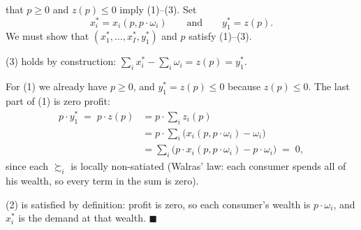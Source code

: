 \documentclass[11pt]{article}
\begin{document}
 that $p\ge 0$ and $z(p)\le 0$ imply (1)--(3). Set
\[ x_i^*=x_i(p,p\cdot\omega_i) \qquad\text{and}\qquad y_1^*=z(p). \]
We must show that $(x_1^*,\dots,x_I^*,y_1^*)$ and $p$ satisfy (1)--(3).

\begin{flatlist}
  \item (3) holds by construction: $\sum_i x_i^*-\sum_i\omega_i=z(p)=y_1^*$.
  \item For (1) we already have $p\ge 0$, and $y_1^*=z(p)\le 0$ because $z(p)\le 0$. The
        last part of (1) is zero profit:
        \begin{align*}
          p\cdot y_1^* \;=\; p\cdot z(p) &= p\cdot\sum_i z_i(p) \\
            &= p\cdot\sum_i\bigl(x_i(p,p\cdot\omega_i)-\omega_i\bigr) \\
            &= \sum_i\bigl(p\cdot x_i(p,p\cdot\omega_i)-p\cdot\omega_i\bigr) \;=\; 0,
        \end{align*}
        since each $\succsim_i$ is locally non-satiated (Walras' law: each consumer spends
        all of his wealth, so every term in the sum is zero).
  \item (2) is satisfied by definition: profit is zero, so each consumer's wealth is
        $p\cdot\omega_i$, and $x_i^*$ is the demand at that wealth. \hfill$\blacksquare$
\end{flatlist}
\end{document}
